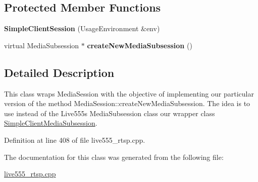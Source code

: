 \subsection*{Protected Member Functions}
\begin{DoxyCompactItemize}
\item 
{\bfseries Simple\+Client\+Session} (Usage\+Environment \&env)\hypertarget{classSimpleClientSession_a1339b30b5f4ad7cc9d6f78ff734bb43b}{}\label{classSimpleClientSession_a1339b30b5f4ad7cc9d6f78ff734bb43b}

\item 
virtual Media\+Subsession $\ast$ {\bfseries create\+New\+Media\+Subsession} ()\hypertarget{classSimpleClientSession_a68a0a9b087d4907b8d16513f6546b420}{}\label{classSimpleClientSession_a68a0a9b087d4907b8d16513f6546b420}

\end{DoxyCompactItemize}


\subsection{Detailed Description}
This class wraps Media\+Session with the objective of implementing our particular version of the method Media\+Session\+::create\+New\+Media\+Subsession. The idea is to use instead of the Live555\textquotesingle{}s Media\+Subsession class our wrapper class \hyperlink{classSimpleClientMediaSubsession}{Simple\+Client\+Media\+Subsession}. 

Definition at line 408 of file live555\+\_\+rtsp.\+cpp.



The documentation for this class was generated from the following file\+:\begin{DoxyCompactItemize}
\item 
\hyperlink{live555__rtsp_8cpp}{live555\+\_\+rtsp.\+cpp}\end{DoxyCompactItemize}
